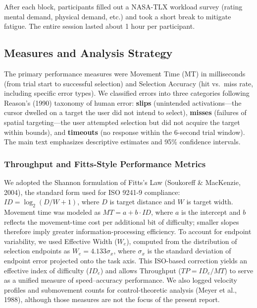 \documentclass[
  11pt,
  11pt,
  letterpaper]{article}
\begin{document}
After each block, participants filled out a NASA-TLX workload survey
(rating mental demand, physical demand, etc.) and took a short break to
mitigate fatigue. The entire session lasted about 1 hour per
participant.

\subsection{Measures and Analysis
Strategy}\label{measures-and-analysis-strategy}

The primary performance measures were Movement Time (MT) in milliseconds
(from trial start to successful selection) and Selection Accuracy (hit
vs.~miss rate, including specific error types). We classified errors
into three categories following Reason's (1990) taxonomy of human error:
\textbf{slips} (unintended activations---the cursor dwelled on a target
the user did not intend to select), \textbf{misses} (failures of spatial
targeting---the user attempted selection but did not acquire the target
within bounds), and \textbf{timeouts} (no response within the 6-second
trial window). The main text emphasizes descriptive estimates and 95\%
confidence intervals.

\subsubsection{Throughput and Fitts-Style Performance
Metrics}\label{throughput-and-fitts-style-performance-metrics}

We adopted the Shannon formulation of Fitts's Law (Soukoreff \&
MacKenzie, 2004), the standard form used for ISO 9241-9 compliance:
\(ID = \log_2(D/W + 1)\), where \(D\) is target distance and \(W\) is
target width. Movement time was modeled as \(MT = a + b \cdot ID\),
where \(a\) is the intercept and \(b\) reflects the movement-time cost
per additional bit of difficulty; smaller slopes therefore imply greater
information-processing efficiency. To account for endpoint variability,
we used Effective Width (\(W_e\)), computed from the distribution of
selection endpoints as \(W_e = 4.133 \sigma_x\), where \(\sigma_x\) is
the standard deviation of endpoint error projected onto the task axis.
This ISO-based correction yields an effective index of difficulty
(\(ID_e\)) and allows Throughput (\(TP = ID_e / MT\)) to serve as a
unified measure of speed--accuracy performance. We also logged velocity
profiles and submovement counts for control-theoretic analysis (Meyer et
al., 1988), although those measures are not the focus of the present
report.
\end{document}
